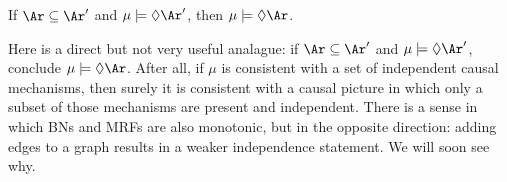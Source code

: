 \begin{subappendices}
{\begin{prop}
        \label{prop:mono}
    If $\Ar \subseteq \Ar'$ and 
    $\mu \models \Diamond\Ar'$, then $\mu \models \Diamond\Ar$.
\end{prop}
}%
Here is a direct but not very useful analague: if $\Ar \subseteq \Ar'$ and $\mu \models \Diamond\Ar'$, conclude $\mu \models \Diamond\Ar$. 
%
After all, if 
$\mu$ is consistent with a set of independent causal mechanisms, then surely 
it is
consistent with a causal picture
in which
only a subset of those mechanisms 
are
present and independent.  
{%
There is a sense in which 
    BNs and MRFs are also monotonic,
    but in the opposite direction:
    adding edges to a graph results in a weaker
    independence statement.
    We will soon see why.
}%



\end{subappendices}
